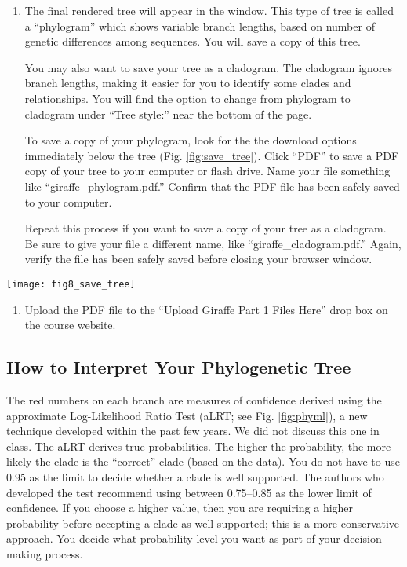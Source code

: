 \documentclass[11pt, addpoints]{exam}
\begin{document}
\begin{enumerate}
\item
  The final rendered tree will appear in the window. This type of tree is called
  a “phylogram” which shows variable branch lengths, based on number of 
  genetic differences among sequences. You will save a copy of this tree.
  
  You may also want to save your tree as a cladogram. The cladogram ignores
  branch lengths, making it easier for you to identify some clades and relationships.
  You will find the option to change from phylogram to cladogram under “Tree style:”
  near the bottom of the page.
  
  To save a copy of your phylogram, look for the the download options immediately 
  below the tree (Fig. \ref{fig:save_tree}). Click “PDF” to
  save a PDF copy of your tree to your computer or flash drive. Name your file something
  like “giraffe\_phylogram.pdf.” Confirm that the PDF file has been safely saved to your 
  computer.
  
  Repeat this process if you want to save a copy of your tree as a cladogram. Be sure to
  give your file a different name, like “giraffe\_cladogram.pdf.” Again, verify the file has
  been safely saved before closing your browser window.
  
\end{enumerate}

\begin{center}
	\texttt{[image: fig8\_save\_tree]}
\end{center}

\begin{enumerate}
\item
  Upload the PDF file to the ``Upload Giraffe Part 1 Files Here'' drop
  box on the course website.
\end{enumerate}

\subsection*{How to Interpret Your Phylogenetic Tree}

The red numbers on each branch are measures of confidence derived using
the approximate Log-Likelihood Ratio Test (aLRT; see Fig. \ref{fig:phyml}), a new
technique developed within the past few years. We did not discuss this
one in class. The aLRT derives true probabilities. The higher the
probability, the more likely the clade is the ``correct'' clade (based
on the data). You do not have to use 0.95 as the limit to decide whether
a clade is well supported. The authors who developed the test recommend
using between 0.75--0.85 as the lower limit of confidence. If you choose
a higher value, then you are requiring a higher probability before
accepting a clade as well supported; this is a more conservative
approach. You decide what probability level you want as part of your
decision making process.
\end{document}
